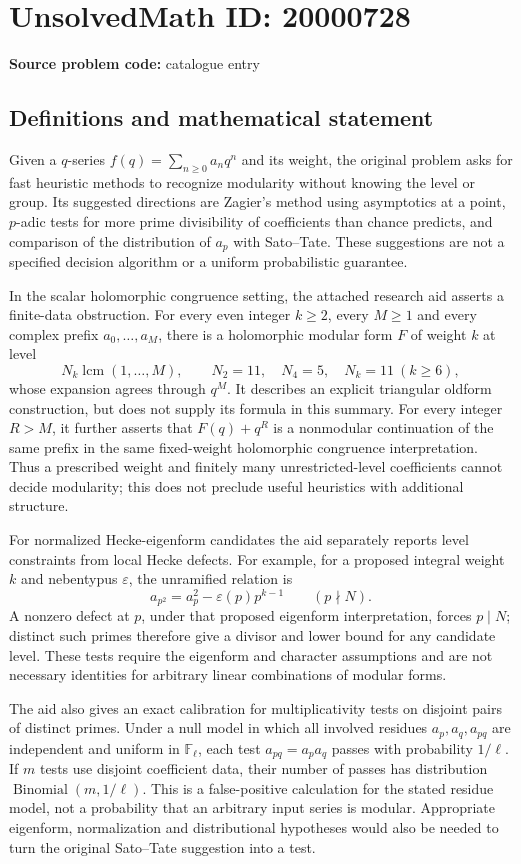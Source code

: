 \documentclass[11pt]{article}
\newcommand{\F}{\mathbb{F}}
\begin{document}
\section*{UnsolvedMath ID: 20000728}
\textbf{Source problem code:} catalogue entry
\subsection{Definitions and mathematical statement}
Given a $q$-series $f(q)=\sum_{n\ge0}a_nq^n$ and its weight, the original problem asks for fast heuristic methods to recognize modularity without knowing the level or group. Its suggested directions are Zagier's method using asymptotics at a point, $p$-adic tests for more prime divisibility of coefficients than chance predicts, and comparison of the distribution of $a_p$ with Sato--Tate. These suggestions are not a specified decision algorithm or a uniform probabilistic guarantee.

In the scalar holomorphic congruence setting, the attached research aid asserts a finite-data obstruction. For every even integer $k\ge2$, every $M\ge1$ and every complex prefix $a_0,\ldots,a_M$, there is a holomorphic modular form $F$ of weight $k$ at level
\[
N_k\operatorname{lcm}(1,\ldots,M),\qquad N_2=11,\quad N_4=5,\quad N_k=11\ (k\ge6),
\]
whose expansion agrees through $q^M$. It describes an explicit triangular oldform construction, but does not supply its formula in this summary. For every integer $R>M$, it further asserts that $F(q)+q^R$ is a nonmodular continuation of the same prefix in the same fixed-weight holomorphic congruence interpretation. Thus a prescribed weight and finitely many unrestricted-level coefficients cannot decide modularity; this does not preclude useful heuristics with additional structure.

For normalized Hecke-eigenform candidates the aid separately reports level constraints from local Hecke defects. For example, for a proposed integral weight $k$ and nebentypus $\varepsilon$, the unramified relation is
\[
a_{p^2}=a_p^2-\varepsilon(p)p^{k-1}\qquad(p\nmid N).
\]
A nonzero defect at $p$, under that proposed eigenform interpretation, forces $p\mid N$; distinct such primes therefore give a divisor and lower bound for any candidate level. These tests require the eigenform and character assumptions and are not necessary identities for arbitrary linear combinations of modular forms.

The aid also gives an exact calibration for multiplicativity tests on disjoint pairs of distinct primes. Under a null model in which all involved residues $a_p,a_q,a_{pq}$ are independent and uniform in $\F_\ell$, each test $a_{pq}=a_pa_q$ passes with probability $1/\ell$. If $m$ tests use disjoint coefficient data, their number of passes has distribution $\operatorname{Binomial}(m,1/\ell)$. This is a false-positive calculation for the stated residue model, not a probability that an arbitrary input series is modular. Appropriate eigenform, normalization and distributional hypotheses would also be needed to turn the original Sato--Tate suggestion into a test.
\end{document}
